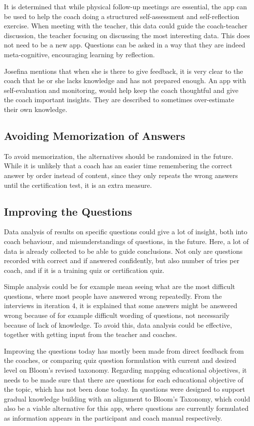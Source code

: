 It is determined that while physical follow-up meetings are essential, the app can be used to help the coach doing a structured self-assessment and self-reflection exercise. When meeting with the teacher, this data could guide the coach-teacher discussion, the teacher focusing on discussing the most interesting data. This does not need to be a new app. Questions can be asked in a way that they are indeed meta-cognitive, encouraging learning by reflection.

Josefina mentions that when she is there to give feedback, it is very clear to the coach that he or she lacks knowledge and has not prepared enough. An app with self-evaluation and monitoring, would help keep the coach thoughtful and give the coach important insights. They are described to sometimes over-estimate their own knowledge.

\subsection{Avoiding Memorization of Answers}
To avoid memorization, the alternatives should be randomized in the future. While it is unlikely that a coach has an easier time remembering the correct answer by order instead of content, since they only repeats the wrong answers until the certification test, it is an extra measure.

\subsection{Improving the Questions}
Data analysis of results on specific questions could give a lot of insight, both into coach behaviour, and misunderstandings of questions, in the future. Here, a lot of data is already collected to be able to guide conclusions. Not only are questions recorded with correct and if answered confidently, but also number of tries per coach, and if it is a training quiz or certification quiz.

Simple analysis could be for example mean seeing what are the most difficult questions, where most people have answered wrong repeatedly. From the interviews in iteration 4, it is explained that some answers might be answered wrong because of for example difficult wording of questions, not necessarily because of lack of knowledge. To avoid this, data analysis could be effective, together with getting input from the teacher and coaches.

Improving the questions today has mostly been made from direct feedback from the coaches, or comparing quiz question formulation with current and desired level on Bloom's revised taxonomy. Regarding mapping educational objectives, it needs to be made sure that there are questions for each educational objective of the topic, which has not been done today. In \cite{yengin} questions were designed to support gradual knowledge building with an alignment to Bloom’s Taxonomy, which could also be a viable alternative for this app, where questions are currently formulated as information appears in the participant and coach manual respectively.
